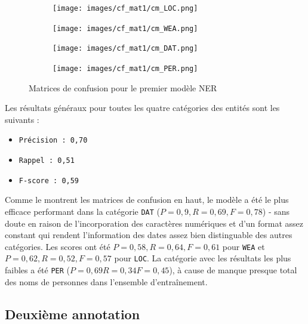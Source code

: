 \documentclass[a4paper,twoside,12pt]{article}
\begin{document}
\begin{figure}[h]
\centering
\begin{subfigure}
    \centering
    \texttt{[image: images/cf\_mat1/cm\_LOC.png]}
\end{subfigure}
\begin{subfigure}
    \centering
    \texttt{[image: images/cf\_mat1/cm\_WEA.png]}
\end{subfigure}

\begin{subfigure}
    \centering
    \texttt{[image: images/cf\_mat1/cm\_DAT.png]}
\end{subfigure}
\begin{subfigure}
    \centering
    \texttt{[image: images/cf\_mat1/cm\_PER.png]}
\end{subfigure}
\caption{Matrices de confusion pour le premier modèle NER}
\label{fig:conf_mat1}
\end{figure}

Les résultats généraux pour toutes les quatre catégories des entités sont les suivants :
\vspace{1ex}
\begin{itemize}[label=$\bullet$]
    \item \texttt{Précision : 0,70}
    \item \texttt{Rappel : 0,51}
    \item \texttt{F-score : 0,59}
\end{itemize}
\vspace{2ex}

\clearpage

Comme le montrent les matrices de confusion en haut, le modèle a été le plus efficace performant dans la catégorie \texttt{DAT} ($P=0,9, R=0,69, F=0,78$) - sans doute en raison de l'incorporation des caractères numériques et d'un format assez constant qui rendent l'information des dates assez bien distinguable des autres catégories. Les scores ont été $P=0,58, R=0,64, F=0,61$ pour \texttt{WEA} et $P=0,62, R=0,52, F=0,57$ pour \texttt{LOC}. La catégorie avec les résultats les plus faibles a été \texttt{PER} ($P=0,69 R=0,34 F=0,45$), à cause de manque presque total des noms de personnes dans l'ensemble d'entraînement.





\subsection{Deuxième annotation}
\end{document}
